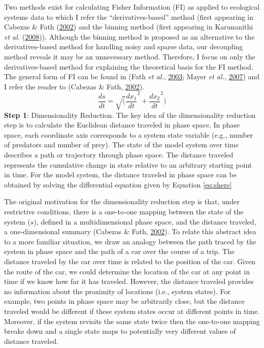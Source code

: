 \documentclass[12pt,twoside,openany]{reedthesis}
\begin{document}
Two methods exist for calculating Fisher Information (FI) as applied to ecological systems data to which I refer the ``derivatives-based'' method (first appearing in Cabezas \& Fath (\protect\hyperlink{ref-cabezas_towards_2002}{2002}) and the binning method (first appearing in Karunanithi \emph{et al.} (\protect\hyperlink{ref-karunanithi_detection_2008}{2008})). Although the binning method is proposed as an alternative to the derivatives-based method for handling noisy and sparse data, our decoupling method reveals it may be an unnecessary method. Therefore, I focus on only the derivatives-based method for explaining the theoretical basis for the FI method. The general form of FI can be found in (Fath \emph{et al.}, \protect\hyperlink{ref-fath_regime_2003}{2003}; Mayer \emph{et al.}, \protect\hyperlink{ref-mayer_applications_2007}{2007}) and I refer the reader to (Cabezas \& Fath, \protect\hyperlink{ref-cabezas_towards_2002}{2002}).
\begin{equation}  
\frac{ds}{dt} = \sqrt(\frac{dx_1}{dt}^2 + \frac{dx_2}{dt}^2)
\label{eq:shere}
\end{equation}
\textbf{Step 1}: Dimensionality Reduction. The key idea of the dimensionality reduction step is to calculate the Euclidean distance traveled in phase space. In phase space, each coordinate axis corresponds to a system state variable (e.g., number of predators and number of prey). The state of the model system over time describes a path or trajectory through phase space. The distance traveled represents the cumulative change in state relative to an arbitrary starting point in time. For the model system, the distance traveled in phase space can be obtained by solving the differential equation given by Equation \eqref{eq:shere}

The original motivation for the dimensionality reduction step is that, under restrictive conditions, there is a one-to-one mapping between the state of the system (\(s\)), defined in a multidimensional phase space, and the distance traveled, a one-dimensional summary (Cabezas \& Fath, \protect\hyperlink{ref-cabezas_towards_2002}{2002}). To relate this abstract idea to a more familiar situation, we draw an analogy between the path traced by the system in phase space and the path of a car over the course of a trip. The distance traveled by the car over time is related to the position of the car. Given the route of the car, we could determine the location of the car at any point in time if we know how far it has traveled. However, the distance traveled provides no information about the proximity of locations (i.e., system states). For example, two points in phase space may be arbitrarily close, but the distance traveled would be different if these system states occur at different points in time. Moreover, if the system revisits the same state twice then the one-to-one mapping breaks down and a single state maps to potentially very different values of distance traveled.
\end{document}
